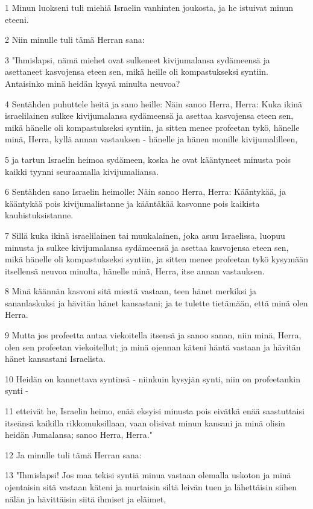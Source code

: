 \par 1 Minun luokseni tuli miehiä Israelin vanhinten joukosta, ja he istuivat minun eteeni.
\par 2 Niin minulle tuli tämä Herran sana:
\par 3 "Ihmislapsi, nämä miehet ovat sulkeneet kivijumalansa sydämeensä ja asettaneet kasvojensa eteen sen, mikä heille oli kompastukseksi syntiin. Antaisinko minä heidän kysyä minulta neuvoa?
\par 4 Sentähden puhuttele heitä ja sano heille: Näin sanoo Herra, Herra: Kuka ikinä israelilainen sulkee kivijumalansa sydämeensä ja asettaa kasvojensa eteen sen, mikä hänelle oli kompastukseksi syntiin, ja sitten menee profeetan tykö, hänelle minä, Herra, kyllä annan vastauksen - hänelle ja hänen monille kivijumalilleen,
\par 5 ja tartun Israelin heimoa sydämeen, koska he ovat kääntyneet minusta pois kaikki tyynni seuraamalla kivijumaliansa.
\par 6 Sentähden sano Israelin heimolle: Näin sanoo Herra, Herra: Kääntykää, ja kääntykää pois kivijumalistanne ja kääntäkää kasvonne pois kaikista kauhistuksistanne.
\par 7 Sillä kuka ikinä israelilainen tai muukalainen, joka asuu Israelissa, luopuu minusta ja sulkee kivijumalansa sydämeensä ja asettaa kasvojensa eteen sen, mikä hänelle oli kompastukseksi syntiin, ja sitten menee profeetan tykö kysymään itsellensä neuvoa minulta, hänelle minä, Herra, itse annan vastauksen.
\par 8 Minä käännän kasvoni sitä miestä vastaan, teen hänet merkiksi ja sananlaskuksi ja hävitän hänet kansastani; ja te tulette tietämään, että minä olen Herra.
\par 9 Mutta jos profeetta antaa viekoitella itsensä ja sanoo sanan, niin minä, Herra, olen sen profeetan viekoitellut; ja minä ojennan käteni häntä vastaan ja hävitän hänet kansastani Israelista.
\par 10 Heidän on kannettava syntinsä - niinkuin kysyjän synti, niin on profeetankin synti -
\par 11 etteivät he, Israelin heimo, enää eksyisi minusta pois eivätkä enää saastuttaisi itseänsä kaikilla rikkomuksillaan, vaan olisivat minun kansani ja minä olisin heidän Jumalansa; sanoo Herra, Herra."
\par 12 Ja minulle tuli tämä Herran sana:
\par 13 "Ihmislapsi! Jos maa tekisi syntiä minua vastaan olemalla uskoton ja minä ojentaisin sitä vastaan käteni ja murtaisin siltä leivän tuen ja lähettäisin siihen nälän ja hävittäisin siitä ihmiset ja eläimet,

